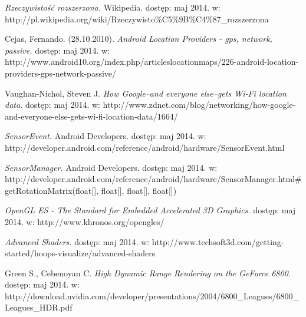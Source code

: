 \documentclass[a4paper,twocolumn,11pt]{article}
\begin{document}
\begin{thebibliography}{9}
 \small

  \emph{Rzeczywistość rozszerzona.}
                              Wikipedia.
                              dostęp: maj 2014.
                              w: http://pl.wikipedia.org/wiki/Rzeczywisto\%C5\%9B\%C4\%87\_rozszerzona

  Cejas, Fernando.
                   (28.10.2010).
                   \emph{Android Location Providers - gps, network, passive.}
                   dostęp: maj 2014.
                   w: http://www.android10.org/index.php/articleslocationmaps/226-android-location-providers-gps-network-passive/
 
  Vaughan-Nichol, Steven J.
                    \emph{How Google--and everyone else--gets Wi-Fi location data.}
                    dostęp: maj 2014.
                    w: http://www.zdnet.com/blog/networking/how-google-and-everyone-else-gets-wi-fi-location-data/1664/

  \emph{SensorEvent.}
                              Android Developers.
                              dostęp: maj 2014.
                              w: http://developer.android.com/reference/android/hardware/SensorEvent.html

  \emph{SensorManager.}
                              Android Developers.
                              dostęp: maj 2014.
                              w: http://developer.android.com/reference/android/hardware/SensorManager.html\#getRotationMatrix(float[], float[], float[], float[])

  \emph{OpenGL ES - The Standard for Embedded Accelerated 3D Graphics.}
                  dostęp: maj 2014.
                  w: http://www.khronos.org/opengles/

  \emph{Advanced Shaders.}
                  dostęp: maj 2014.
                  w: http://www.techsoft3d.com/getting-started/hoops-visualize/advanced-shaders

  Green S., Cebenoyan C.
                   \emph{High Dynamic Range Rendering on the GeForce 6800.}
                   dostęp: maj 2014.
                   w: http://download.nvidia.com/developer/presentations/2004/6800\_Leagues/6800\_Leagues\_HDR.pdf

\end{thebibliography}
\end{document}
